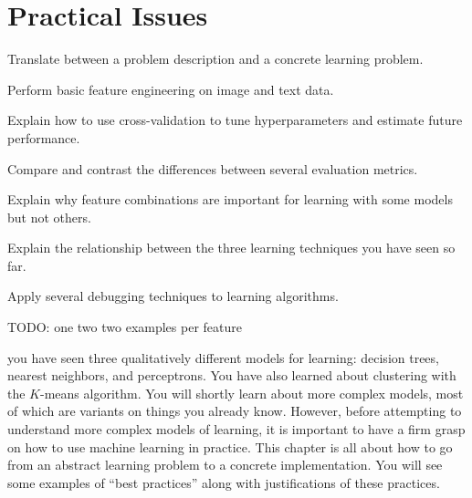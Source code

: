 \chapter{Practical Issues} \label{sec:prac}



\begin{learningobjectives}
\item Translate between a problem description and a concrete learning
  problem.
\item Perform basic feature engineering on image and text data.
\item Explain how to use cross-validation to tune hyperparameters and
  estimate future performance.
\item Compare and contrast the differences between several evaluation
  metrics.
\item Explain why feature combinations are important for learning with
  some models but not others.
\item Explain the relationship between the three learning techniques
  you have seen so far.
\item Apply several debugging techniques to learning algorithms.
\end{learningobjectives}

TODO: one two two examples per feature


 you have seen three qualitatively
different models for learning: decision trees, nearest neighbors, and
perceptrons.  You have also learned about clustering with the
$K$-means algorithm.  You will shortly learn about more complex
models, most of which are variants on things you already know.
However, before attempting to understand more complex models of
learning, it is important to have a firm grasp on how to use machine
learning in practice.  This chapter is all about how to go from an
abstract learning problem to a concrete implementation.  You will see
some examples of ``best practices'' along with justifications of these
practices.

